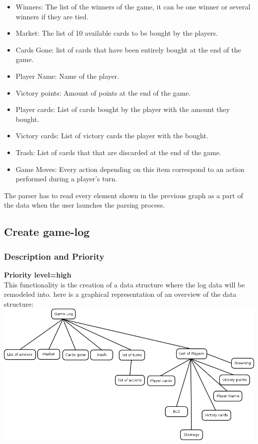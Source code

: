 \documentclass{scrreprt}
\begin{document}
\begin{itemize}
\item Winners: The list of the winners of the game, it can be one winner or several winners if they are tied.
\item Market: The list of 10 available cards to be bought by the players.
\item Cards Gone: list of cards that have been entirely bought at the end of the game.
\item Player Name: Name of the player.
\item Victory points: Amount of points at the end of the game.
\item Player cards: List of cards bought by the player with the amount they bought.
\item Victory cards: List of victory cards the player with the bought.
\item Trash: List of cards that that are discarded at the end of the game.
\item Game Moves: Every action depending on this item correspond to an action performed during a player's turn.
\end{itemize}

The parser has to read every element shown in the previous graph as a part of the data when the user launches the parsing process.\\


\subsection{Create game-log}
\subsubsection{Description and Priority}
\textbf{Priority level=high}\\
This functionality is the creation of a data structure where the log data will
be remodeled into.
here is a graphical representation of an overview of the data structure:\\
\includegraphics[scale=0.5,keepaspectratio]{game-log}
\end{document}
